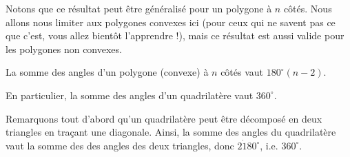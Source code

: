 Notons que ce résultat peut être généralisé pour un polygone à $n$ côtés. Nous allons nous limiter aux polygones convexes ici (pour ceux qui ne savent pas ce que c'est, vous allez bientôt l'apprendre !), mais ce résultat est aussi valide pour les polygones non convexes.

\begin{thm}
La somme des angles d'un polygone (convexe) à $n$ côtés vaut $180^\circ(n-2)$.

En particulier, la somme des angles d'un quadrilatère vaut $360^\circ$.
\end{thm}

\begin{preuve}
Remarquons tout d'abord qu'un quadrilatère peut être décomposé en deux triangles en traçant une diagonale.
\newline
Ainsi, la somme des angles du quadrilatère vaut la somme des des angles des deux triangles, donc $2 \dot 180^\circ$, i.e. $360^\circ$.


\end{preuve}
